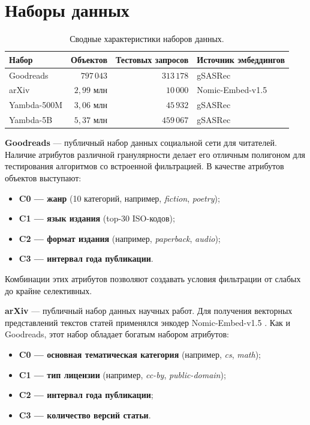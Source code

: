 \documentclass[14pt,a4paper]{extreport}
\numberwithin{figure}{chapter}
\numberwithin{table}{chapter}
\numberwithin{equation}{chapter}
\begin{document}
\section{Наборы данных}

\begin{table}[htbp]
    \caption{Сводные характеристики наборов данных.}
    \label{tab:datasets}
    \centering
    \begin{tabular}{lrrl}
        \toprule
        Набор & Объектов & Тестовых запросов & Источник эмбеддингов \\
        \midrule
        Goodreads        & $797\,043$ & $313\,178$ & gSASRec \\
        arXiv            & $2{,}99$ млн & $10\,000$  & Nomic-Embed-v1.5 \\
        Yambda-500M      & $3{,}06$ млн & $45\,932$  & gSASRec \\
        Yambda-5B        & $5{,}37$ млн & $459\,067$ & gSASRec \\
        \bottomrule
    \end{tabular}
\end{table}

\textbf{Goodreads} \cite{wan2018item, wan2019fine} --- публичный набор данных социальной сети для читателей. Наличие атрибутов различной гранулярности делает его отличным полигоном для тестирования алгоритмов со встроенной фильтрацией. В качестве атрибутов объектов выступают:
\begin{itemize}
  \item \textbf{C0 --- жанр} (10 категорий, например, \textit{fiction}, \textit{poetry});
  \item \textbf{C1 --- язык издания} (top-30 ISO-кодов);
  \item \textbf{C2 --- формат издания} (например, \textit{paperback}, \textit{audio});
  \item \textbf{C3 --- интервал года публикации}.
\end{itemize}
Комбинации этих атрибутов позволяют создавать условия фильтрации от слабых до крайне селективных.

\textbf{arXiv} \cite{clement2019arxiv} --- публичный набор данных научных работ. Для получения векторных представлений текстов статей применялся энкодер Nomic-Embed-v1.5 \cite{nussbaum2024nomic}. Как и Goodreads, этот набор обладает богатым набором атрибутов:
\begin{itemize}
  \item \textbf{C0 --- основная тематическая категория} (например, \textit{cs}, \textit{math});
  \item \textbf{C1 --- тип лицензии} (например, \textit{cc-by}, \textit{public-domain});
  \item \textbf{C2 --- интервал года публикации};
  \item \textbf{C3 --- количество версий статьи}.
\end{itemize}
\end{document}
